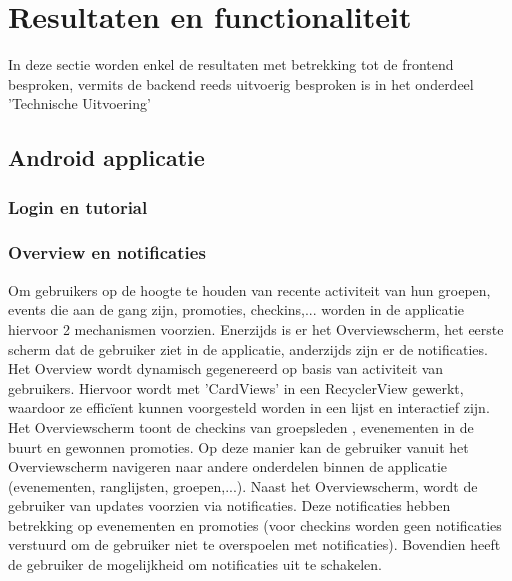 
\chapter{Resultaten en functionaliteit}
In deze sectie worden enkel de resultaten met betrekking tot de frontend besproken, vermits de backend reeds uitvoerig besproken is in het onderdeel 'Technische Uitvoering'
\section{Android applicatie}
\subsection{Login en tutorial} %
\subsection{Overview en notificaties} %
Om gebruikers op de hoogte te houden van recente activiteit van hun groepen, events die aan de gang zijn, promoties, checkins,... worden in de applicatie hiervoor 2 mechanismen voorzien. Enerzijds is er het Overviewscherm, het eerste scherm dat de gebruiker ziet in de applicatie, anderzijds zijn er de notificaties.
Het Overview wordt dynamisch gegenereerd op basis van activiteit van gebruikers. Hiervoor wordt met 'CardViews' in een RecyclerView gewerkt, waardoor ze efficïent kunnen voorgesteld worden in een lijst en interactief zijn. Het Overviewscherm toont de checkins van groepsleden , evenementen in de buurt en gewonnen promoties. Op deze manier kan de gebruiker vanuit het Overviewscherm navigeren naar andere onderdelen binnen de applicatie (evenementen, ranglijsten, groepen,...).
Naast het Overviewscherm, wordt de gebruiker van updates voorzien via notificaties. Deze notificaties hebben betrekking op evenementen en promoties (voor checkins worden geen notificaties verstuurd om de gebruiker niet te overspoelen met notificaties). Bovendien heeft de gebruiker de mogelijkheid om notificaties uit te schakelen.


